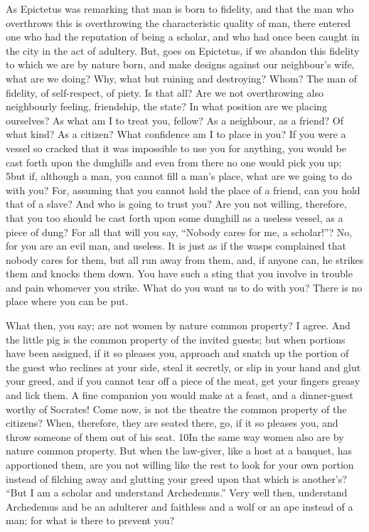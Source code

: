 As Epictetus was remarking that man is born to fidelity, and that the man who overthrows this is overthrowing the characteristic quality of man, there entered one who had the reputation of being a scholar, and who had once been caught in the city in the act of adultery. But, goes on Epictetus, if we abandon this fidelity to which we are by nature born, and make designs against our neighbour's wife, what are we doing? Why, what but ruining and destroying? Whom? The man of fidelity, of self-respect, of piety. Is that all? Are we not overthrowing also neighbourly feeling, friendship, the state? In what position are we placing ourselves? As what am I to treat you, fellow? As a neighbour, as a friend? Of what kind? As a citizen? What confidence am I to place in you? If you were a vessel so cracked that it was impossible to use you for anything, you would be cast forth upon the dunghills and even from there no one would pick you up; 5but if, although a man, you cannot fill a man's place, what are we going to do with you? For, assuming that you cannot hold the place of a friend, can you hold that of a slave? And who is going to trust you? Are you not willing, therefore, that you too should be cast forth upon some dunghill as a useless vessel, as a piece of dung? For all that will you say, ``Nobody cares for me, a scholar!''? No, for you are an evil man, and useless. It is just as if the wasps complained that nobody cares for them, but all run away from them, and, if anyone can, he strikes them and knocks them down. You have such a sting that you involve in trouble and pain whomever you strike. What do you want us to do with you? There is no place where you can be put.

What then, you say; are not women by nature common property? I agree. And the little pig is the common property of the invited guests; but when portions have been assigned, if it so pleases you, approach and snatch up the portion of the guest who reclines at your side, steal it secretly, or slip in your hand and glut your greed, and if you cannot tear off a piece of the meat, get your fingers greasy and lick them. A fine companion you would make at a feast, and a dinner-guest worthy of Socrates! Come now, is not the theatre the common property of the citizens? When, therefore, they are seated there, go, if it so pleases you, and throw someone of them out of his seat. 10In the same way women also are by nature common property. But when the law-giver, like a host at a banquet, has apportioned them, are you not willing like the rest to look for your own portion instead of filching away and glutting your greed upon that which is another's? ``But I am a scholar and understand Archedemus.'' Very well then, understand Archedemus and be an adulterer and faithless and a wolf or an ape instead of a man; for what is there to prevent you?

